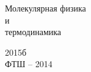 \vspace*{5cm}

\begin{center}
	\LARGE{Молекулярная физика}\\[0.5cm]
	\LARGE{и}\\[0.5cm]
	\LARGE{термодинамика}\\[0.5cm]
\end{center}

\vspace{7.7cm}

\begin{center}
2015б\\[0.5cm]
ФТШ -- 2014
\end{center}